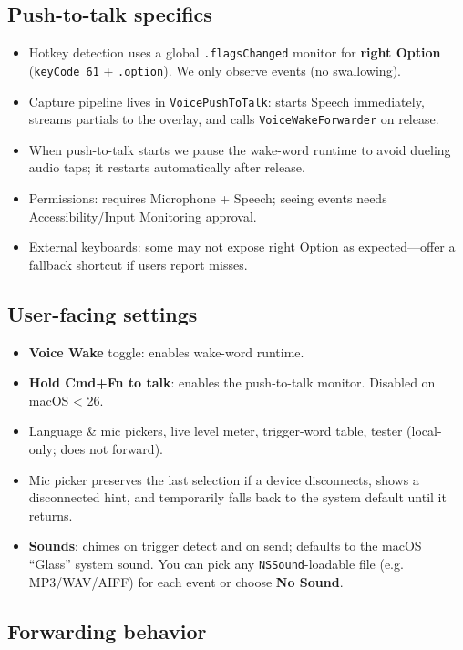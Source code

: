 \subsection{Push-to-talk specifics}


\begin{itemize}
  \item Hotkey detection uses a global \texttt{.flagsChanged} monitor for \textbf{right Option} (\texttt{keyCode 61} + \texttt{.option}). We only observe events (no swallowing).
  \item Capture pipeline lives in \texttt{VoicePushToTalk}: starts Speech immediately, streams partials to the overlay, and calls \texttt{VoiceWakeForwarder} on release.
  \item When push-to-talk starts we pause the wake-word runtime to avoid dueling audio taps; it restarts automatically after release.
  \item Permissions: requires Microphone + Speech; seeing events needs Accessibility/Input Monitoring approval.
  \item External keyboards: some may not expose right Option as expected—offer a fallback shortcut if users report misses.
\end{itemize}


\subsection{User-facing settings}


\begin{itemize}
  \item \textbf{Voice Wake} toggle: enables wake-word runtime.
  \item \textbf{Hold Cmd+Fn to talk}: enables the push-to-talk monitor. Disabled on macOS < 26.
  \item Language \& mic pickers, live level meter, trigger-word table, tester (local-only; does not forward).
  \item Mic picker preserves the last selection if a device disconnects, shows a disconnected hint, and temporarily falls back to the system default until it returns.
  \item \textbf{Sounds}: chimes on trigger detect and on send; defaults to the macOS “Glass” system sound. You can pick any \texttt{NSSound}-loadable file (e.g. MP3/WAV/AIFF) for each event or choose \textbf{No Sound}.
\end{itemize}


\subsection{Forwarding behavior}



